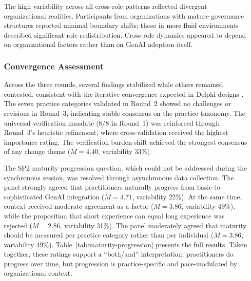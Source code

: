 The high variability across all cross-role patterns reflected divergent
organizational realities. Participants from organizations with mature
governance structures reported minimal boundary shifts; those in more fluid
environments described significant role redistribution. Cross-role dynamics
appeared to depend on organizational factors rather than on GenAI adoption
itself.

\subsubsection{Convergence Assessment}\label{subsubsec:convergence}

Across the three rounds, several findings stabilized while others remained
contested, consistent with the iterative convergence expected in Delphi designs
\parencite{von_der_gracht_consensus_2012}. The seven practice categories validated in Round~2 showed no
challenges or revisions in Round~3, indicating stable consensus on the practice
taxonomy. The universal verification mandate (8/8 in Round~1) was reinforced
through Round~3's heuristic refinement, where cross-validation received the
highest importance rating. The verification burden shift achieved the strongest
consensus of any change theme ($M = 4.40$, variability 33\%).

The SP2 maturity progression question, which could not be addressed during the
synchronous session, was resolved through asynchronous data collection. The panel
strongly agreed that practitioners naturally progress from basic to sophisticated
GenAI integration ($M = 4.71$, variability 22\%). At the same time, context
received moderate agreement as a factor ($M = 3.86$, variability 49\%), while the
proposition that short experience can equal long experience was rejected
($M = 2.86$, variability 31\%). The panel moderately agreed that maturity should
be measured per practice category rather than per individual ($M = 3.86$,
variability 49\%). Table~\ref{tab:maturity-progression} presents the full
results. Taken together, these ratings support a ``both/and'' interpretation:
practitioners do progress over time, but progression is practice-specific and
pace-modulated by organizational context.

